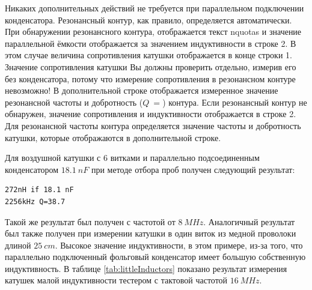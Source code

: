 Никаких дополнительных действий не требуется при параллельном подключении конденсатора.
Резонансный контур, как правило, определяется автоматически.
При обнаружении резонансного контура, отображается текст nquotas  и значение параллельной ёмкости
отображается за значением индуктивности в строке 2.
В этом случае величина сопротивления катушки отображается в конце строки 1.
Значение сопротивления катушки Вы должны проверить отдельно, измерив его без конденсатора,
потому что измерение сопротивления в резонансном контуре невозможно!
В дополнительной строке отображается измеренное значение резонансной частоты и добротность (\(Q~=\)) контура.
Если резонансный контур не обнаружен, значение сопротивления и индуктивности отображается в строке 2.
Для резонансной частоты контура определяется значение частоты и добротность катушки,
которые отображаются в дополнительной строке.

Для воздушной катушки с 6 витками и параллельно подсоединенным конденсатором \(18.1~nF\) при методе
отбора проб получен следующий результат:

\begin{verbatim}
272nH if 18.1 nF
2256kHz Q=38.7
\end{verbatim}

Такой же результат был получен с частотой от \(8~MHz\).
Аналогичный результат был также получен при измерении катушки в один виток из медной проволоки длиной \(25~cm\).
Высокое значение индуктивности, в этом примере, из-за того, что параллельно подключенный фольговый конденсатор
имеет большую собственную индуктивность.
В таблице \ref{tab:littleInductors} показано результат измерения катушек малой индуктивности
тестером с тактовой частотой \(16~MHz\).  

